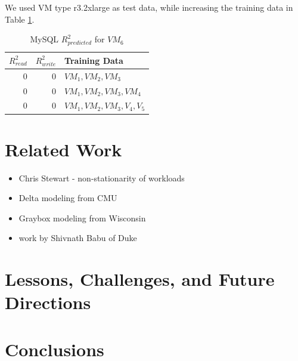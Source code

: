 \documentclass{acm_proc_article-sp}
\begin{document}
We used VM type r3.2xlarge as test data, while increasing the training data in Table \ref{table:mysql}.

\begin{table}
\centering
\caption{MySQL $R_{predicted}^2$ for $VM_6$}
\begin{tabular}{|r|r|l|} \hline
$R_{read}^2$&$R_{write}^2$&Training Data\\ \hline
0 & 0& $VM_1,VM_2,VM_3$\\ \hline
0 & 0& $VM_1,VM_2,VM_3,VM_4$\\ \hline
0 & 0& $VM_1,VM_2,VM_3,V_4,V_5$\\ \hline
\hline\end{tabular}
\label{table:mysql}
\end{table}

\section{Related Work}

\begin{itemize}
   \item Chris Stewart - non-stationarity of workloads
   \item Delta modeling from CMU
   \item Graybox modeling from Wisconsin
   \item work by Shivnath Babu of Duke
\end{itemize}


\section{Lessons, Challenges, and Future Directions}

\section{Conclusions}



%

%
%

\balancecolumns
\end{document}
